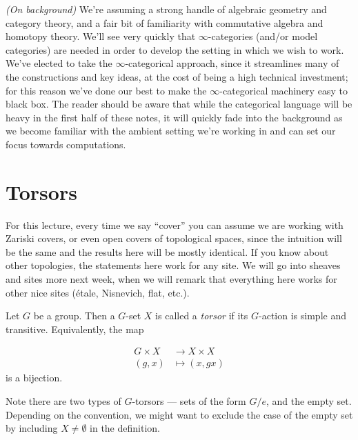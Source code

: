 \documentclass[11pt]{amsart}
\begin{document}
\begin{remark} \textit{(On background)} We're assuming a strong handle of algebraic geometry and category theory, and a fair bit of familiarity with commutative algebra and homotopy theory. We'll see very quickly that $\infty$-categories (and/or model categories) are needed in order to develop the setting in which we wish to work. We've elected to take the $\infty$-categorical approach, since it streamlines many of the constructions and key ideas, at the cost of being a high technical investment; for this reason we've done our best to make the $\infty$-categorical machinery easy to black box. The reader should be aware that while the categorical language will be heavy in the first half of these notes, it will quickly fade into the background as we become familiar with the ambient setting we're working in and can set our focus towards computations.
\end{remark}

\newpage
\section{Torsors}

\begin{assumption} For this lecture, every time we say ``cover'' you can assume we are working with Zariski covers, or even open covers of topological spaces, since the intuition will be the same and the results here will be mostly identical. If you know about other topologies, the statements here work for any site. We will go into sheaves and sites more next week, when we will remark that everything here works for other nice sites (\'etale, Nisnevich, flat, etc.).
\end{assumption}

\begin{definition} Let $G$ be a group. Then a $G$-set $X$ is called a \textit{torsor} if its $G$-action is simple and transitive. Equivalently, the map

\begin{equation}\label{eqn:torsor-G-set}
\begin{aligned}
    G \times X &\to X \times X \\
    (g,x) &\mapsto (x,gx)
\end{aligned}
\end{equation}
is a bijection.
\end{definition}

Note there are two types of $G$-torsors --- sets of the form $G/e$, and the empty set. Depending on the convention, we might want to exclude the case of the empty set by including $X \ne \emptyset$ in the definition.
\end{document}
